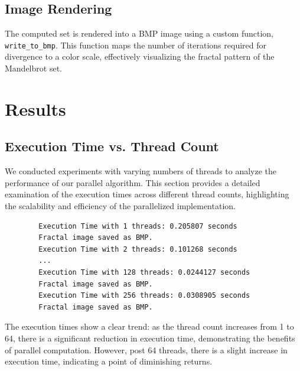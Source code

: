 \documentclass[11pt]{article}
\begin{document}
\subsection{Image Rendering}
The computed set is rendered into a BMP image using a custom function, \texttt{write\_to\_bmp}. This function maps the number of iterations required for divergence to a color scale, effectively visualizing the fractal pattern of the Mandelbrot set.

\section{Results}
\subsection{Execution Time vs. Thread Count}
We conducted experiments with varying numbers of threads to analyze the performance of our parallel algorithm. This section provides a detailed examination of the execution times across different thread counts, highlighting the scalability and efficiency of the parallelized implementation.

    \begin{verbatim}
        Execution Time with 1 threads: 0.205807 seconds
        Fractal image saved as BMP.
        Execution Time with 2 threads: 0.101268 seconds
        ...
        Execution Time with 128 threads: 0.0244127 seconds
        Fractal image saved as BMP.
        Execution Time with 256 threads: 0.0308905 seconds
        Fractal image saved as BMP.
    \end{verbatim}

    The execution times show a clear trend: as the thread count increases from 1 to 64, there is a significant reduction in execution time, demonstrating the benefits of parallel computation. However, post 64 threads, there is a slight increase in execution time, indicating a point of diminishing returns.

    \begin{center}  
    \end{center}
\end{document}
